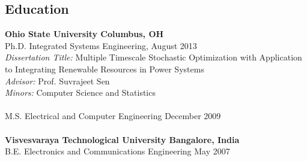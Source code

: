 \documentclass[hyperref, margin]{myResume}
\begin{document}
 


\address{3145 Dyer Street, Suite 337, Dallas, TX 75275\\Website: \url{gjharsha.github.io}}
\address{Email: \href{mailto:harsha@smu.edu}{harsha@smu.edu} \\ Phone: (214)-768-3076}
 
\begin{resume} 

\section{Education}
\textbf{Ohio State University \hfill Columbus, OH} \\
Ph.D. Integrated Systems Engineering, \hfill August 2013\\
\textit{Dissertation Title:} Multiple Timescale Stochastic Optimization with Application to Integrating Renewable Resources in Power Systems\\
\textit{Advisor:} Prof. Suvrajeet Sen \\
\textit{Minors:} Computer Science and Statistics\\
\\
M.S. Electrical and Computer Engineering \hfill December 2009 \\
\\
\textbf{Visvesvaraya Technological University \hfill Bangalore, India}\\
B.E. Electronics and Communications Engineering \hfill May 2007


\end{resume}
\end{document}
